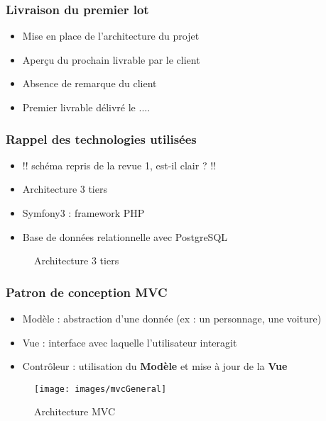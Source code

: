 
\speaker{\Kafui}
\begin{frame}
  \frametitle{Livraison du premier lot}
  \begin{itemize}
	\item Mise en place de l'architecture du projet
	\item Aperçu du prochain livrable par le client
	\item Absence de remarque du client
	\item Premier livrable délivré le ....
  \end{itemize}
\end{frame}

\begin{frame}
  \frametitle{Rappel des technologies utilisées}
  \begin{itemize}
	\item !! schéma repris de la revue 1, est-il clair ? !!
	\item Architecture 3 tiers
	\item Symfony3 : framework PHP 
	\item Base de données relationnelle avec PostgreSQL
  \end{itemize}

  \begin{figure}[!h]
	\begin{center}
	
	\caption{\label{3tiers_schema} Architecture 3 tiers}
	\end{center}
  \end{figure}

\end{frame}

\begin{frame}
  \frametitle{Patron de conception MVC}
  \begin{itemize}
	\item Modèle : abstraction d'une donnée (ex : un personnage, une voiture)
	\item Vue : interface avec laquelle l'utilisateur interagit
	\item Contrôleur : utilisation du \textbf{Modèle} et mise à jour de la \textbf{Vue}
  \end{itemize}

\begin{figure}[!h]
	\begin{center}
	\texttt{[image: images/mvcGeneral]}
	\caption{Architecture MVC}
	\end{center}
\end{figure}

\end{frame}

